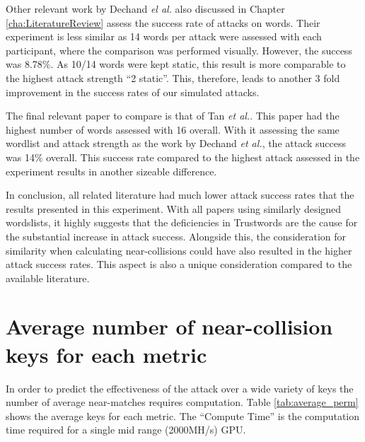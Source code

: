 Other relevant work by Dechand \textit{el al.}\cite{dechand2016empirical} also discussed in Chapter \ref{cha:LiteratureReview} assess the success rate of attacks on words. Their experiment is less similar as 14 words per attack were assessed with each participant, where the comparison was performed visually. However, the success was 8.78\%. As 10/14 words were kept static, this result is more comparable to the highest attack strength ``2 static''. This, therefore, leads to another 3 fold improvement in the success rates of our simulated attacks. 

The final relevant paper to compare is that of Tan \textit{et al.}\cite{tan2017can}. This paper had the highest number of words assessed with 16 overall. With it assessing the same wordlist and attack strength as the work by Dechand \textit{et al.}, the attack success was 14\% overall. This success rate compared to the highest attack assessed in the experiment results in another sizeable difference.

In conclusion, all related literature had much lower attack success rates that the results presented in this experiment. With all papers using similarly designed wordslists, it highly suggests that the deficiencies in Trustwords are the cause for the substantial increase in attack success. Alongside this, the consideration for similarity when calculating near-collisions could have also resulted in the higher attack success rates. This aspect is also a unique consideration compared to the available literature.


\section{Average number of near-collision keys for each metric}
\label{sec:averagePerms}
In order to predict the effectiveness of the attack over a wide variety of keys the number of average near-matches requires computation. Table \ref{tab:average_perm} shows the average keys for each metric. The ``Compute Time'' is the computation time required for a single mid range (2000MH/s) GPU.

